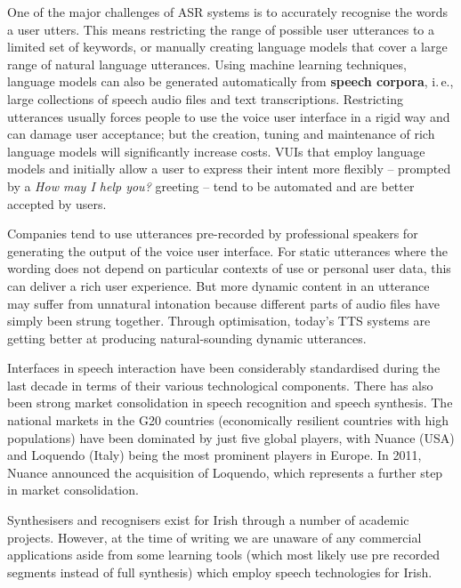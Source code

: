 \documentclass[]{../../metanetpaper}
\begin{document}
\begin{multicols}{2}
One of the major challenges of ASR systems is to accurately recognise the words a user utters. This means restricting the range of possible user utterances to a limited set of keywords, or manually creating language models that cover a large range of natural language utterances. Using machine learning techniques, language models can also be generated automatically from \textbf{speech corpora}, i.\,e., large collections of speech audio files and text transcriptions. Restricting utterances usually forces people to use the voice user interface in a rigid way and can damage user acceptance; but the creation, tuning and maintenance of rich language models will significantly increase costs. VUIs that employ language models and initially allow a user to express their intent more flexibly -- prompted by a \textit{How may I help you?} greeting -- tend to be automated and are better accepted by users.


Companies tend to use utterances pre-recorded by professional speakers for generating the output of the voice user interface. For static utterances where the wording does not depend on particular contexts of use or personal user data, this can deliver a rich user experience. But more dynamic content in an utterance may suffer from unnatural intonation because different parts of audio files have simply been strung together. Through optimisation, today's TTS systems are getting better at producing natural-sounding dynamic utterances.

Interfaces in speech interaction have been considerably standardised during the last decade in terms of their various technological components. There has also been strong market consolidation in speech recognition and speech synthesis. The national markets in the G20 countries (economically resilient countries with high populations) have been dominated by just five global players, with Nuance (USA) and Loquendo (Italy) being the most prominent players in Europe. In 2011, Nuance announced the acquisition of Loquendo, which represents a further step in market consolidation.

Synthesisers and recognisers exist for Irish through a number of academic projects. However, at the time of writing we are unaware of any commercial applications aside from some learning tools (which most likely use pre recorded segments instead of full synthesis) which employ speech technologies for Irish.


\end{multicols}
\end{document}
